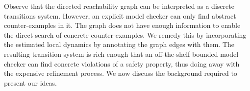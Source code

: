 Observe that the directed reachability graph can be interpreted as a
discrete transitions system. However, an explicit model checker can
only find abstract counter-examples in it. The graph does not have
enough information to enable the direct search of concrete
counter-examples. We remedy this by incorporating the estimated local
dynamics by annotating the graph edges with them. The resulting
transition system is rich enough that an off-the-shelf bounded model
checker can find concrete violations of a safety property, thus doing
away with the expensive refinement process. We now discuss the
background required to present our ideas.
